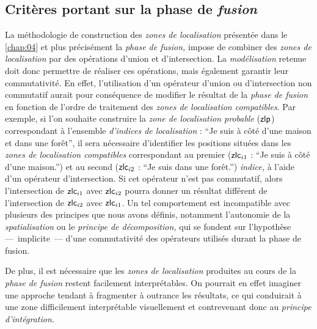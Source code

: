 %   

\subsection{Critères portant sur la phase de \emph{fusion}}

La méthodologie de construction des \emph{zones de localisation}
présentée dans le \autoref{chap:04} et plus précisément la \emph{phase
  de fusion,} impose de combiner des \emph{zones de localisation} par
des opérations d'union et d'intersection. La \emph{modélisation}
retenue doit donc permettre de réaliser ces opérations, mais également
garantir leur commutativité. En effet, l'utilisation d'un opérateur
d'union ou d'intersection non commutatif aurait pour conséquence de
modifier le résultat de la \emph{phase de fusion} en fonction de
l'ordre de traitement des \emph{zones de localisation
  compatibles}. Par exemple, si l'on souhaite construire la \emph{zone
  de localisation probable} ($\text{\textsf{zlp}}$) correspondant à
l'ensemble \emph{d'indices de localisation} : \enquote{Je suis à côté
  d'une maison et dans une forêt}, il sera nécessaire d'identifier les
positions situées dans les \emph{zones de localisation compatibles}
correspondant au premier ($\text{\textsf{zlc}}_{i1}$ : \enquote{Je
  suis à côté d'une maison.}) et au second ($\text{\textsf{zlc}}_{i2}$
: \enquote{Je suis dans une forêt.}) \emph{indice,} à l'aide d'un
opérateur d'intersection. Si cet opérateur n'est pas commutatif, alors
l'intersection de $\text{\textsf{zlc}}_{i1}$ avec
$\text{\textsf{zlc}}_{i2}$ pourra donner un résultat différent de
l'intersection de $\text{\textsf{zlc}}_{i2}$ avec
$\text{\textsf{zlc}}_{i1}$. Un tel comportement est incompatible avec
plusieurs des principes que nous avons définis, notamment l'autonomie
de la \emph{spatialisation} ou le \emph{principe de décomposition,}
qui se fondent sur l'hypothèse ---~implicite~--- d'une commutativité
des opérateurs utilisés durant la phase de fusion.

De plus, il est nécessaire que les \emph{zones de localisation}
produites au cours de la \emph{phase de fusion} restent facilement
interprétables. On pourrait en effet imaginer une approche tendant à
fragmenter à outrance les résultats, ce qui conduirait à une zone
difficilement interprétable visuellement et contrevenant donc au
\emph{principe d'intégration.}



